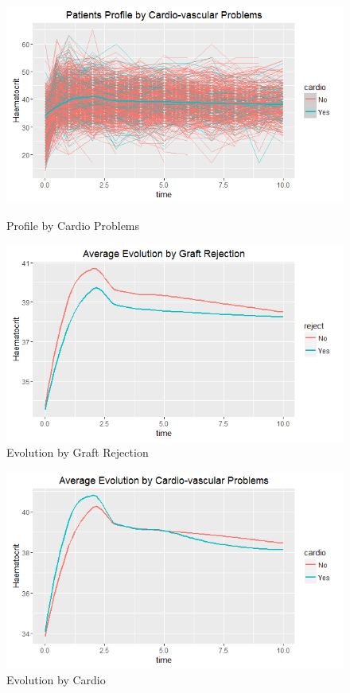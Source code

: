 \documentclass[11pt]{article}
\begin{document}
\begin{figure}[H]
\centering
\begin{minipage}{.5\textwidth}
\includegraphics[scale=0.5]{patientprofilecardio.png}
\caption{Profile by Cardio Problems}
\end{minipage}
\begin{minipage}{.4\textwidth}
\includegraphics[scale=0.5]{averageevolutionreject.png}
\caption{Evolution by Graft Rejection}
\end{minipage}
\end{figure}

\begin{figure}[H]
\centering
\begin{minipage}{.4\textwidth}

\end{minipage}
\begin{minipage}{.4\textwidth}
\includegraphics[scale=0.5]{averageevolutioncardio.png}
\caption{Evolution by Cardio}
\end{minipage}
\end{figure}
\end{document}
